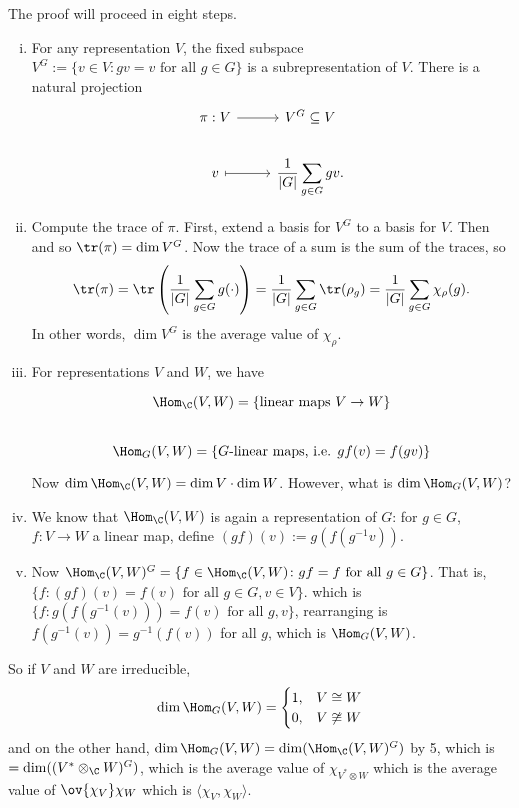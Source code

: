 \pf The proof will proceed in eight steps.
	\begin{enumerate}[(i)]
	\item For any representation $V$, the fixed subspace $V^G:=\{v \in V \colon gv=v \text{ for all }g \in G\}$ is a subrepresentation of $V$. There is a natural projection
		\[
		\begin{tikzcd}
		\pi: V \arrow{r} & V^G \subseteq V \\
		v \arrow[mapsto]{r} & \displaystyle\dfrac{1}{|G|} \sum_{g \in G} gv.
		\end{tikzcd}
		\]
	\item Compute the trace of $\pi$. First, extend a basis for $V^G$ to a basis for $V$. Then
		and so $\tr(\pi)= \dim V^G$. Now the trace of a sum is the sum of the traces, so 
			\[
			\tr(\pi)= \tr\left( \dfrac{1}{|G|} \sum_{g \in G} g(\cdot) \right) = \dfrac{1}{|G|} \sum_{g \in G} \tr(\rho_g)= \dfrac{1}{|G|} \sum_{g \in G} \chi_\rho(g).
			\]
		In other words, $\dim V^G$ is the average value of $\chi_\rho$. 
	
	\item For representations $V$ and $W$, we have
		\[
		\begin{tikzcd}
		\Hom_\C(V,W)=\{\text{linear maps }V \to W\} \\ %
		\Hom_G(V,W) = \left\{ G\text{-linear maps, i.e. }gf(v)=f(gv)\right\}
		\end{tikzcd}
		\] 
	Now $\dim \Hom_\C(V,W)= \dim V \cdot \dim W$. However, what is $\dim \Hom_G(V,W)$? 
	
	
	\item We know that $\Hom_\C(V,W)$ is again a representation of $G$: for $g \in G$, $f: V \to W$ a linear map, define $(gf)(v):= g(f(g^{-1}v))$. %
	
	\item Now $\Hom_\C(V,W)^G= \{ f \in \Hom_\C(V,W) \colon gf=f \text{ for all }g \in G\}$. That is, $\{ f \colon (gf)(v)=f(v) \text{ for all }g \in G, v \in V\}$. which is $\{f \colon g(f(g^{-1}(v)))=f(v) \text{ for all }g,v\}$, rearranging is $f(g^{-1}(v))= g^{-1}(f(v))$ for all $g$, which is $\Hom_G(V,W)$. 
	\end{enumerate}
So if $V$ and $W$ are irreducible, 
	\[
	\dim \Hom_G(V,W)= 
	\begin{cases}
	1, & V \cong W \\
	0, & V \not\cong W
	\end{cases}
	\]
and on the other hand, $\dim \Hom_G(V,W)= \dim(\Hom_\C(V,W)^G)$ by 5, which is $=\dim((V^* \otimes_\C W)^G)$, which is the average value of $\chi_{V^* \otimes W}$ which is the average value of $\ov{\chi_V} \chi_W$ which is $\langle \chi_V, \chi_W \rangle$. 








